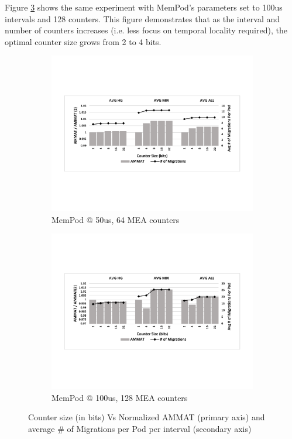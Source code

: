 Figure \ref{fig:counter_size_old} shows the same experiment with MemPod's parameters set to 100us intervals and 128 counters. This figure demonstrates that as the interval and number of counters increases (i.e. less focus on temporal locality required), the optimal counter size grows from 2 to 4 bits.

\begin{figure}
	\begin{subfigure}{\linewidth}
    	\includegraphics[width=\linewidth]{figures/revised/new/ctr_size.pdf}
    	\caption{MemPod @ 50us, 64 MEA counters \\ \hfill}\label{fig:counter_size}
	\end{subfigure}
	\begin{subfigure}[b]{\linewidth}
    	\includegraphics[width=\linewidth]{figures/revised/old/ctr_size.pdf}
    	\caption{MemPod @ 100us, 128 MEA counters}\label{fig:counter_size_old}
	\end{subfigure}
	\caption{Counter size (in bits) Vs Normalized AMMAT (primary axis) and average \# of Migrations per Pod per interval (secondary axis)}
\end{figure}

